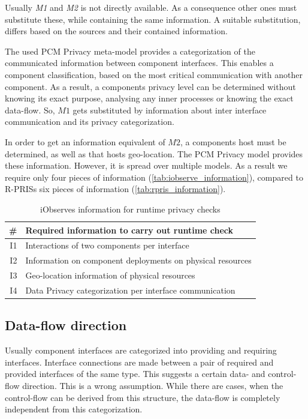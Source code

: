 Usually \textit{M1} and \textit{M2} is not directly available. As a consequence other ones must substitute these, while containing the same information. A suitable substitution, differs based on the sources and their contained information.

The used PCM Privacy meta-model provides a categorization of the communicated information between component interfaces. This enables a component classification, based on the most critical communication with another component. As a result, a components privacy level can be determined without knowing its exact purpose, analysing any inner processes or knowing the exact data-flow. So, $M1$ gets substituted by information about inter interface communication and its privacy categorization.

In order to get an information equivalent of $M2$, a components host must be determined, as well as that hosts geo-location. The PCM Privacy model provides these information. However, it is spread over multiple models. As a result we require only four pieces of information (\autoref{tab:iobserve_information}), compared to R-PRISs six pieces of information (\autoref{tab:rpris_information}).

\begin{table}[h]
	\centering
	\begin{tabular}{r | l}
		\hline
		\textbf{\#} & \textbf{Required information to carry out runtime check}\\
		\hline
		I1 & Interactions of two components per interface \\
		I2 & Information on component deployments on physical resources \\
		I3 & Geo-location information of physical resources \\
		I4 & Data Privacy categorization per interface communication \\
		\hline
	\end{tabular}
	\caption{iObserves information for runtime privacy checks}
	\label{tab:iobserve_information}
\end{table}

\subsection{Data-flow direction}
\label{sec:PrivacyAnalysis:theory:dataflow}
Usually component interfaces are categorized into providing and requiring interfaces. Interface connections are made between a pair of required and provided interfaces of the same type. This suggests a certain data- and control-flow direction. This is a wrong assumption. While there are cases, when the control-flow can be derived from this structure, the data-flow is completely independent from this categorization.

